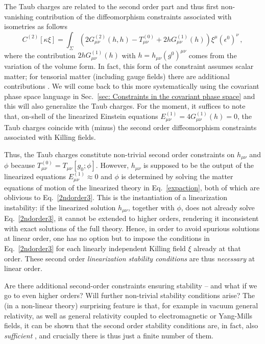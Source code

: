 \documentclass[]{jkpaper}
\theoremstyle{plain}
\theoremstyle{definition}
\begin{document}
The Taub charges are related to the second order part and thus first non-vanishing contribution of the diffeomorphism constraints associated with isometries as follows
\begin{equation}\label{2ndorderconstraint}
    C^{(2)}[\kappa\xi]=\int_\Sigma\left(2G^{(2)}_{\mu \nu}(h,h)-T_{\mu \nu}^{(0)}+2hG^{(1)}_{\mu \nu}(h)\right)\xi^\mu(\epsilon^0)^\nu\,,
\end{equation}
where the contribution $2hG^{(1)}_{\mu \nu}(h)$ with $h=h_{\mu \nu}(g^0)^{\mu \nu}$ comes from the variation of the volume form. In fact, this form of the constraint assumes scalar matter; for tensorial matter (including gauge fields) there are additional contributions \cite{Seifert:2006kv}. We will come back to this more systematically using the covariant phase space language in Sec.~\ref{sec: Constraints in the covariant phase space} and this will also generalize the Taub charges. For the moment, it suffices to note that, on-shell of the linearized Einstein equations $E^{(1)}_{\mu \nu}=4G^{(1)}_{\mu \nu}(h)=0$, the Taub charges coincide with (minus) the second order diffeomorphism constraints associated with Killing fields.

Thus, the Taub charges constitute non-trivial second order constraints on $h_{\mu \nu}$ and $\phi$ because $T^{(0)}_{\mu \nu}=T_{\mu \nu}[g_0;\phi]$. However, $h_{\mu \nu}$ is supposed to be the output of the linearized equations $E^{(1)}_{\mu \nu}\approx0$ and $\phi$ is determined by solving the matter equations of motion of the linearized theory in Eq.~\eqref{expaction}, both of which are oblivious to Eq.~\eqref{2ndorder3}. This is the instantiation of a linearization instability: if the linearized solution $h_{\mu \nu}$, together with $\phi$, does not already solve Eq.~\eqref{2ndorder3}, it cannot be extended to higher orders, rendering it inconsistent with exact solutions of the full theory. Hence, in order to avoid spurious solutions at linear order, one has no option but to impose the conditions in Eq.~\eqref{2ndorder3} for each linearly independent  Killing field $\xi$ already at that order. These second order \emph{linearization stability conditions} are thus \emph{necessary} at linear order. 

Are there additional second-order constraints ensuring stability -- and what if we go to even higher orders? Will further non-trivial stability conditions arise? The (in a non-linear theory) surprising feature is that, for example in vacuum general relativity, as well as general relativity coupled to electromagnetic or Yang-Mills fields, it can be shown that the second order stability conditions are, in fact, also \emph{sufficient} \cite{fischer1980structure,Arms:1982ea,Marsden_lectures}, and crucially there is thus just a finite number of them. 
\end{document}
